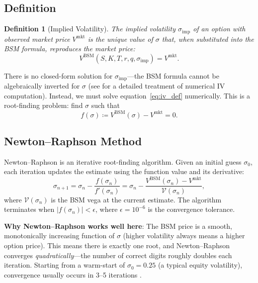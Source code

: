 \documentclass[12pt, a4paper]{article}
\newtheorem{definition}{Definition}
\begin{document}
\subsection{Definition}

\begin{definition}[Implied Volatility]
The implied volatility $\sigma_{\text{imp}}$ of an option with observed market
price $V^{\text{mkt}}$ is the unique value of $\sigma$ that, when substituted
into the BSM formula, reproduces the market price:
\begin{equation}
    V^{\text{BSM}}(S, K, T, r, q, \sigma_{\text{imp}}) = V^{\text{mkt}}.
    \label{eq:iv_def}
\end{equation}
\end{definition}

There is no closed-form solution for $\sigma_{\text{imp}}$---the BSM formula
cannot be algebraically inverted for $\sigma$ (see \cite{jaeckel2015lets} for a
detailed treatment of numerical IV computation). Instead, we must solve
equation~\eqref{eq:iv_def} numerically. This is a root-finding problem: find
$\sigma$ such that
\begin{equation}
    f(\sigma) \coloneqq V^{\text{BSM}}(\sigma) - V^{\text{mkt}} = 0.
    \label{eq:rootfinding}
\end{equation}

\subsection{Newton--Raphson Method}
\label{sec:newton}

Newton--Raphson is an iterative root-finding algorithm. Given an initial guess
$\sigma_0$, each iteration updates the estimate using the function value and its
derivative:
\begin{equation}
    \sigma_{n+1} = \sigma_n - \frac{f(\sigma_n)}{f'(\sigma_n)}
                 = \sigma_n - \frac{V^{\text{BSM}}(\sigma_n) - V^{\text{mkt}}}
                                   {\mathcal{V}(\sigma_n)},
    \label{eq:newton}
\end{equation}
where $\mathcal{V}(\sigma_n)$ is the BSM vega at the current estimate. The
algorithm terminates when $|f(\sigma_n)| < \epsilon$, where
$\epsilon = 10^{-6}$ is the convergence tolerance.

\textbf{Why Newton--Raphson works well here}: The BSM price is a smooth, monotonically
increasing function of $\sigma$ (higher volatility always means a higher option
price). This means there is exactly one root, and Newton--Raphson converges
\emph{quadratically}---the number of correct digits roughly doubles each
iteration. Starting from a warm-start of $\sigma_0 = 0.25$ (a typical equity
volatility), convergence usually occurs in 3--5 iterations
\parencite{brenner1988note}.
\end{document}
